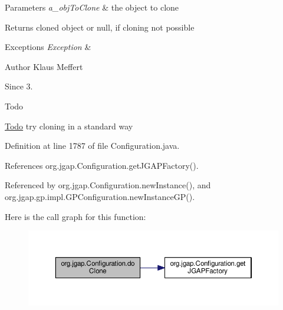 \begin{DoxyParams}{Parameters}
{\em a\-\_\-obj\-To\-Clone} & the object to clone \\
\hline
\end{DoxyParams}
\begin{DoxyReturn}{Returns}
cloned object or null, if cloning not possible 
\end{DoxyReturn}

\begin{DoxyExceptions}{Exceptions}
{\em Exception} & \\
\hline
\end{DoxyExceptions}
\begin{DoxyAuthor}{Author}
Klaus Meffert 
\end{DoxyAuthor}
\begin{DoxySince}{Since}
3. 
\end{DoxySince}
\begin{DoxyRefDesc}{Todo}
\item[\hyperlink{todo__todo000053}{Todo}]try cloning in a standard way \end{DoxyRefDesc}


Definition at line 1787 of file Configuration.\-java.



References org.\-jgap.\-Configuration.\-get\-J\-G\-A\-P\-Factory().



Referenced by org.\-jgap.\-Configuration.\-new\-Instance(), and org.\-jgap.\-gp.\-impl.\-G\-P\-Configuration.\-new\-Instance\-G\-P().



Here is the call graph for this function\-:
\nopagebreak
\begin{figure}[H]
\begin{center}
\leavevmode
\includegraphics[width=350pt]{classorg_1_1jgap_1_1_configuration_a453c6b764b4f017c058632bc22e5a915_cgraph}
\end{center}
\end{figure}


